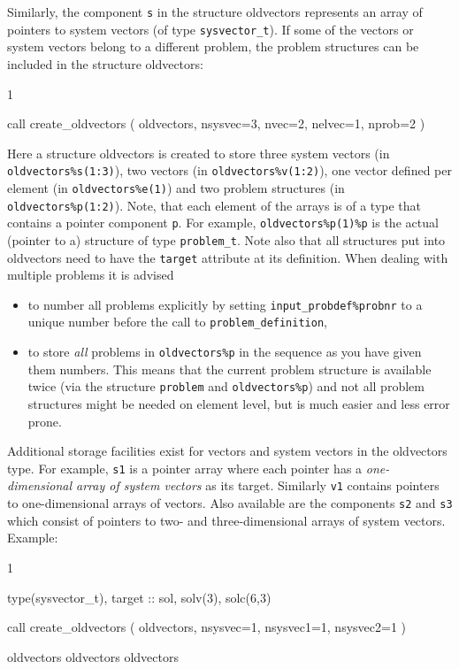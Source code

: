 Similarly, the component \texttt{s} in the structure oldvectors represents an
array of pointers to system vectors (of type \texttt{sysvector\_t}).
If some of
the vectors or system vectors belong to a different problem, the problem
structures can be included in the structure oldvectors:
\begin{listing}{1}
   
   call create_oldvectors ( oldvectors, nsysvec=3, nvec=2, nelvec=1, nprob=2 )

\end{listing}
Here a structure oldvectors is created to store three system vectors
 (in \texttt{oldvectors\%s(1:3)}),
 two vectors
 (in \texttt{oldvectors\%v(1:2)}),
 one vector defined per element
 (in \texttt{oldvectors\%e(1)})
 and two problem structures
 (in \texttt{oldvectors\%p(1:2)}).
Note, that each element of the arrays is of a type that contains a pointer
component \texttt{p}. For example, \texttt{oldvectors\%p(1)\%p} is the
actual (pointer to a) structure of type \texttt{problem\_t}.
Note also that all structures put into oldvectors need to have the
\texttt{target} attribute at its definition.
When dealing with multiple problems it is advised
\begin{itemize}
   \item to number all problems explicitly by setting
      \texttt{input\_probdef\%probnr} to a unique number before the call to
      \texttt{problem\_definition},
   \item to store \emph{all}
        problems in \texttt{oldvectors\%p} in the sequence as you
        have given them numbers. This means that the current problem structure
        is available twice (via the structure \texttt{problem} and
        \texttt{oldvectors\%p}) and not all problem structures might be
        needed on element level, but is much easier and less error prone.
\end{itemize}

Additional storage facilities exist for vectors and
system vectors in the oldvectors type. For example,
\texttt{s1} is a
pointer array where each pointer has a \emph{one-dimensional array of system
vectors} as its target. Similarly \texttt{v1} contains pointers
to one-dimensional arrays of vectors. Also available are the components
\texttt{s2} and \texttt{s3} which consist of pointers to two- and
three-dimensional arrays of system vectors. Example:
\begin{listing}{1}
 
   type(sysvector_t), target :: sol, solv(3), solc(6,3)

   call create_oldvectors ( oldvectors, nsysvec=1, nsysvec1=1, nsysvec2=1 )

   oldvectors%
   oldvectors%
   oldvectors%

\end{listing}

